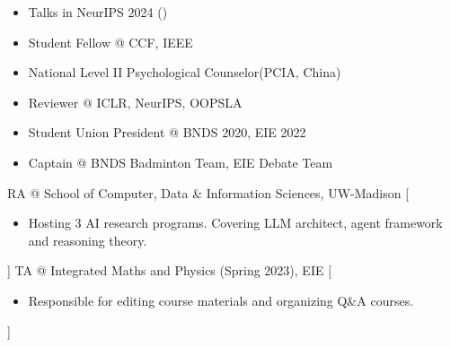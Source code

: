 \documentclass[zh]{resume}
\begin{document}
\begin{itemize}
  \item Talks in NeurIPS 2024 ()
  \item Student Fellow @ CCF, IEEE
  \item National Level II Psychological Counselor(PCIA, China)
  \item Reviewer @ ICLR, NeurIPS, OOPSLA
  \item Student Union President @ BNDS 2020, EIE 2022
  \item Captain @ BNDS Badminton Team, EIE Debate Team
\end{itemize}

\begin{experiences}
    {RA @ School of Computer, Data \& Information Sciences, UW-Madison}%
    [\begin{itemize}
      \item Hosting 3 AI research programs. Covering LLM architect, agent framework and reasoning theory.
    \end{itemize}]
  \separator{0.5ex}
    {TA @ Integrated Maths and Physics (Spring 2023), EIE}%
    [\begin{itemize}
      \item Responsible for editing course materials and organizing Q\&A courses.
    \end{itemize}]

\end{experiences}
\end{document}
